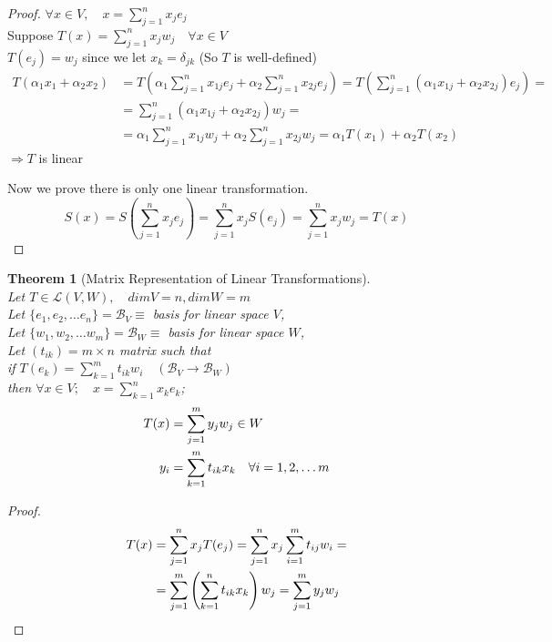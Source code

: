 \documentclass[twoside]{amsart}
\theoremstyle{plain}
\newtheorem{theorem}{Theorem}
\theoremstyle{definition}
\begin{document}
\begin{proof} 
$\forall x \in V, \quad x = \sum_{j=1}^n x_j e_j $\\
Suppose $T(x) = \sum_{j=1}^n x_j w_j \quad \forall x \in V$ \\
\phantom{Supp} $T(e_j) = w_j $ since we let $x_k = \delta_{jk}$ (So $T$ is well-defined)
\begin{align*}
  T(\alpha_1 x_1 + \alpha_2 x_2 ) & = T(\alpha_1 \sum_{j=1}^n x_{1j} e_j + \alpha_2 \sum_{j=1}^n x_{2j} e_j ) = T(\sum_{j=1}^n (\alpha_1 x_{1j} + \alpha_2 x_{2j} ) e_j) = \\
  & = \sum_{j=1}^{n} (\alpha_1 x_{1j} + \alpha_2 x_{2j} ) w_j = \\
  & = \alpha_1 \sum_{j=1}^n x_{1j} w_j + \alpha_2 \sum_{j=1}^n x_{2j} w_j = \alpha_1 T(x_1) + \alpha_2 T(x_2) 
\end{align*}
$\Longrightarrow T$ is linear

Now we prove there is only one linear transformation. 
\[
S(x) = S(\sum_{j=1}^n x_j e_j ) = \sum_{j=1}^n x_j S(e_j) = \sum_{j=1}^n x_j w_j = T(x)
\]
\end{proof}

\begin{theorem}[Matrix Representation of Linear Transformations]\label{T:Matrix_Representation_of_Linear_Transformations}\quad \\
Let $T \in \mathcal{L}(V,W), \quad dim V = n, dim W = m$\\
Let $\{ e_1,e_2,\dots e_n  \} = \mathcal{B}_V \equiv$ basis for linear space $V$, \\
Let $\{ w_1,w_2,\dots w_m  \} = \mathcal{B}_W \equiv$ basis for linear space $W$, \\
Let $(t_{ik}) = m \times n $ matrix such that \\
if $T(e_k) = \sum_{k=1}^m t_{ik}w_i \quad (\mathcal{B}_V \to \mathcal{B}_W )$ \\
\phantom{if} then $\forall x \in V; \quad x = \sum_{k=1}^n x_k e_k$; 
\begin{align}\label{E:Matrix_Representation_Linear_Transformations}
T(x) &= \sum_{j=1}^{m} y_j w_j \in W \notag \\
y_i & = \sum_{k=1}^m t_{ik} x_k \quad \forall i = 1,2,\dots m \notag \\
\end{align}
\end{theorem}

\begin{proof}
\begin{align}
T(x) & = \sum_{j=1}^n x_j T(e_j) = \sum_{j=1}^n x_j \sum_{i=1}^m t_{ij} w_i = \notag \\
& = \sum_{j=1}^m \left( \sum_{k=1}^n t_{ik} x_k \right) w_j = \sum_{j=1}^m y_j w_j \notag 
\end{align}
\end{proof}
\end{document}
